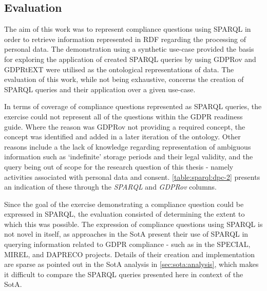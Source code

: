\subsection{Evaluation}\label{sec:testing:sparql:evaluation}
The aim of this work was to represent compliance questions using SPARQL in order to retrieve information represented in RDF regarding the processing of personal data.
The demonstration using a synthetic use-case provided the basis for exploring the application of created SPARQL queries by using GDPRov and GDPRtEXT were utilised as the ontological representations of data.
The evaluation of this work, while not being exhaustive, concerns the creation of SPARQL queries and their application over a given use-case.

In terms of coverage of compliance questions represented as SPARQL queries, the exercise could not represent all of the questions within the GDPR readiness guide.
Where the reason was GDPRov not providing a required concept, the concept was identified and added in a later iteration of the ontology. 
Other reasons include a the lack of knowledge regarding representation of ambiguous information such as `indefinite' storage periods and their legal validity, and the query being out of scope for the research question of this thesis - namely activities associated with personal data and consent.
\autoref{table:sparql:dpc-2} presents an indication of these through the \textit{SPARQL} and \textit{GDPRov} columns.

Since the goal of the exercise demonstrating a compliance question could be expressed in SPARQL, the evaluation consisted of determining the extent to which this was possible. 
The expression of compliance questions using SPARQL is not novel in itself, as approaches in the SotA present their use of SPARQL in querying information related to GDPR compliance - such as in the SPECIAL, MIREL, and DAPRECO projects.
Details of their creation and implementation are sparse as pointed out in the SotA analysis in \autoref{sec:sota:analysis}, which makes it difficult to compare the SPARQL queries presented here in context of the SotA.


